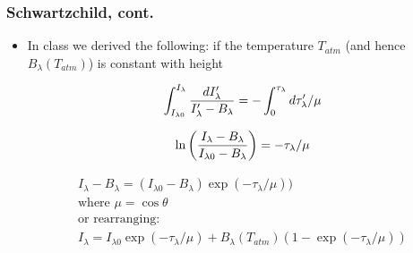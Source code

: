 \documentclass[hyperref={colorlinks=true,linkcolor=blue,urlcolor=blue},numbers]{beamer}
\newcommand{\rad}{%
   \ensuremath{I}
}
\newcommand{\zenith}{%
   \ensuremath{\theta}
}
\begin{document}
\begin{frame}
  \frametitle{ Schwartzchild, cont.}

  \begin{itemize}
  \item In class we derived the following:
 if the temperature $T_{atm}$ (and hence $B_\lambda(T_{atm})$) is constant with height

\begin{equation}
  \label{eq:constTb}
  \int_{\rad_{\lambda 0}}^{\rad_\lambda} \frac{d\rad^\prime_\lambda}{\rad^\prime_\lambda -
  B_\lambda} = - \int_0^{\tau_\lambda} d\tau^\prime_\lambda / \mu
\end{equation}

\begin{equation}
  \label{eq:constTc}
  \ln \left (\frac{\rad_\lambda - B_\lambda}{\rad_{\lambda 0} - B_\lambda}
  \right ) = - \tau_\lambda / \mu
\end{equation}

\begin{gather}
  \label{eq:constTd}
  \rad_\lambda - B_\lambda = (\rad_{\lambda 0} - B_\lambda) \exp(-\tau_\lambda
  / \mu)) \\
\text{where } \mu=\cos \zenith \nonumber\\
\text{or rearranging:}\nonumber\\
  \rad_\lambda = \rad_{\lambda 0} \exp( -\tau_\lambda /\mu ) + B_\lambda (T_{atm})(1
  - \exp( -\tau_\lambda / \mu))
\end{gather}



  \end{itemize}

\end{frame}
\end{document}
